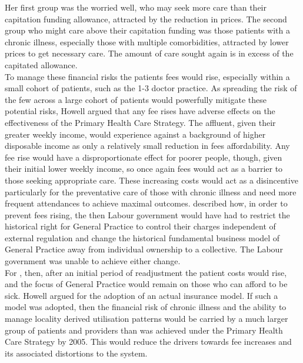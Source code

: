 \documentclass[11pt,a4paper]{article}
\begin{document}
Her first group was the worried well, who may seek more care than their capitation funding allowance, attracted by the reduction in prices. The second group who might care above their capitation funding was those patients with a chronic illness, especially those with multiple comorbidities, attracted by lower prices to get necessary care. The amount of care sought again is in excess of the capitated allowance.\\  

To manage these financial risks the patients fees would rise, especially within a small cohort of patients, such as the 1-3 doctor practice. As spreading the risk of the few across a large cohort of patients would powerfully mitigate these potential risks, Howell argued that any fee rises have adverse effects on the effectiveness of the Primary Health Care Strategy. The affluent, given their greater weekly income, would experience against a background of higher disposable income as only a relatively small reduction in fees affordability. Any fee rise would have a disproportionate effect for poorer people, though, given their initial lower weekly income, so once again fees would act as a barrier to those seeking appropriate care. These increasing costs would act as a disincentive particularly for the preventative care of those with chronic illness and need more frequent attendances to achieve maximal outcomes.  \citet{howell2005restructuring} described how, in order to prevent fees rising, the then Labour government would have had to restrict the historical right for General Practice to control their charges independent of external regulation and change the historical fundamental business model of General Practice away from individual ownership to a collective.  The Labour government was unable to achieve either change.  \\

For \citet{howell2005restructuring}, then, after an initial period of readjustment the patient costs would rise, and the focus of General Practice would remain on those who can afford to be sick. Howell argued for the adoption of an actual insurance model. If such a model was adopted, then the financial risk of chronic illness and the ability to manage locality derived utilisation patterns would be carried by a much larger group of patients and providers than was achieved under the Primary Health Care Strategy by 2005. This would reduce the drivers towards fee increases and its associated distortions to the system.\\
\end{document}
